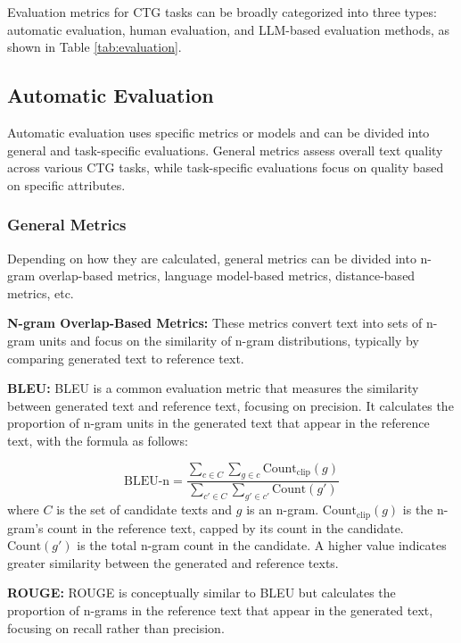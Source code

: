 \documentclass[acmsmall, screen]{acmart}
\begin{document}
Evaluation metrics for CTG tasks can be broadly categorized into three types: automatic evaluation, human evaluation, and LLM-based evaluation methods, as shown in Table \ref{tab:evaluation}.


\subsection{Automatic Evaluation}
Automatic evaluation uses specific metrics or models and can be divided into general and task-specific evaluations. General metrics assess overall text quality across various CTG tasks, while task-specific evaluations focus on quality based on specific attributes.

\subsubsection{\textbf{General Metrics}}
Depending on how they are calculated, general metrics can be divided into n-gram overlap-based metrics, language model-based metrics, distance-based metrics, etc.

\textbf{N-gram Overlap-Based Metrics:} These metrics convert text into sets of n-gram units and focus on the similarity of n-gram distributions, typically by comparing generated text to reference text.

\textbf{BLEU\cite{papineni_acl02_bleu}:} BLEU is a common evaluation metric that measures the similarity between generated text and reference text, focusing on precision. It calculates the proportion of n-gram units in the generated text that appear in the reference text, with the formula as follows:

\begin{equation}
\text{BLEU-n} = \frac{
    \sum_{c \in C} \sum_{g \in c} \text{Count}_{\text{clip}}(g)
}{
    \sum_{c' \in C} \sum_{g' \in c'} \text{Count}(g')
}
\end{equation}
where \( C \) is the set of candidate texts and \( g \) is an n-gram. \(\text{Count}_{\text{clip}}(g)\) is the n-gram's count in the reference text, capped by its count in the candidate. \(\text{Count}(g')\) is the total n-gram count in the candidate. A higher value indicates greater similarity between the generated and reference texts.

\textbf{ROUGE\cite{lin_acl04_rouge}:} ROUGE is conceptually similar to BLEU but calculates the proportion of n-grams in the reference text that appear in the generated text, focusing on recall rather than precision.
\end{document}
